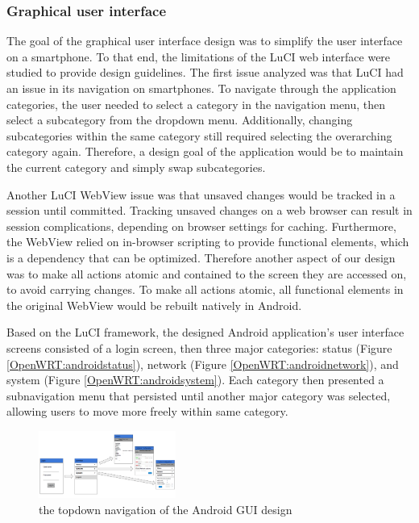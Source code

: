 \subsubsection{Graphical user interface}
The goal of the graphical user interface design was to simplify the user interface on a smartphone. To that end, the limitations of the LuCI web interface were studied to provide design guidelines. The first issue analyzed was that LuCI had an issue in its navigation on smartphones. To navigate through the application categories, the user needed to select a category in the navigation menu, then select a subcategory from the dropdown menu. Additionally, changing subcategories within the same category still required selecting the overarching category again. Therefore, a design goal of the application would be to maintain the current category and simply swap subcategories.
	
Another LuCI WebView issue was that unsaved changes would be tracked in a session until committed. Tracking unsaved changes on a web browser can result in session complications, depending on browser settings for caching. Furthermore, the WebView relied on in-browser scripting to provide functional elements, which is a dependency that can be optimized. Therefore another aspect of our design was to make all actions atomic and contained to the screen they are accessed on, to avoid carrying changes. To make all actions atomic, all functional elements in the original WebView would be rebuilt natively in Android.
	
Based on the LuCI framework, the designed Android application's user interface screens consisted of a login screen, then three major categories: status (Figure \ref{OpenWRT:androidstatus}), network (Figure \ref{OpenWRT:androidnetwork}), and system (Figure \ref{OpenWRT:androidsystem}). Each category then presented a subnavigation menu that persisted until another major category was selected, allowing users to move more freely within same category.

	\begin{figure}
		\centering
		\includegraphics[width=0.4\textwidth]{UItopdown.png}
		\caption{the topdown navigation of the Android GUI design}
		\label{OpenWRT:androidtopdown}
	\end{figure}
	
